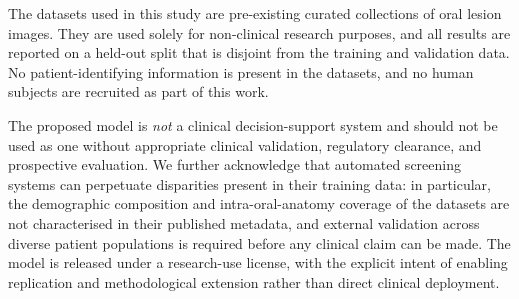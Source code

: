 The datasets used in this study are pre-existing curated collections of oral
lesion images. They are used solely for non-clinical research purposes, and
all results are reported on a held-out split that is disjoint from the
training and validation data. No patient-identifying information is present
in the datasets, and no human subjects are recruited as part of this work.

The proposed model is \emph{not} a clinical decision-support system and
should not be used as one without appropriate clinical validation,
regulatory clearance, and prospective evaluation. We further acknowledge
that automated screening systems can perpetuate disparities present in their
training data: in particular, the demographic composition and
intra-oral-anatomy coverage of the datasets are not characterised in their
published metadata, and external validation across diverse patient
populations is required before any clinical claim can be made. The model is
released under a research-use license, with the explicit intent of enabling
replication and methodological extension rather than direct clinical
deployment.
